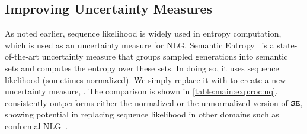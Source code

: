 \def \TabUQ{
{
\setlength{\tabcolsep}{3pt}
\begin{table}%
\caption{
AUROC of using variants of Semantic Entropy to predict the accuracy of responses.
\methodSEAttn significantly improves the original version based on vanilla sequence likelihoods.
}
\label{table:main:exp:roc:uq}
\centering
\end{table}
}}
\TabUQ
\subsection{Improving Uncertainty Measures}\label{sec:exp:uncertainty}
As noted earlier, sequence likelihood is widely used in entropy computation, which is used as an uncertainty measure for NLG.
Semantic Entropy~\citep{kuhn2023semantic} is a state-of-the-art uncertainty measure that groups sampled generations into semantic sets and computes the entropy over these sets.
In doing so, it uses sequence likelihood (sometimes normalized). We simply replace it with \methodnamePrompt to create a new uncertainty measure, \methodSEAttn.
The comparison is shown in \cref{table:main:exp:roc:uq}.
\methodSEAttn consistently outperforms either the normalized or the unnormalized version of $\texttt{SE}$, showing potential in replacing sequence likelihood in other domains such as conformal NLG~\cite{quach2023conformal}.

